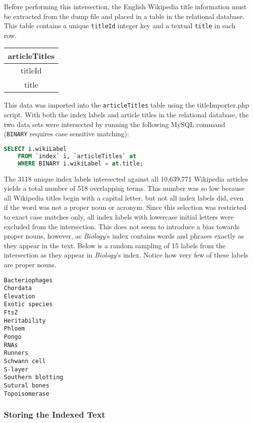 Before performing this intersection, the English Wikipedia title information must be extracted from the dump file and placed in a table in the relational database.
This table contains a unique {\tt titleId} integer key and a textual {\tt title} in each row.

\begin{center}
\begin{tabular}{|c|}
\hline 
{\bf articleTitles} \\ 
\hline 
titleId \\ 
\hline 
title \\ 
\hline 
\end{tabular} 
\end{center}

This data was imported into the {\tt articleTitles} table using the titleImporter.php script.
With both the index labels and article titles in the relational database, the two data sets were intersected by running the following MySQL command ({\tt BINARY} requires case sensitive matching):

\begin{lstlisting}[language=SQL]
SELECT i.wikiLabel
    FROM `index` i, `articleTitles` at
    WHERE BINARY i.wikiLabel = at.title;
\end{lstlisting}

The 3118 unique index labels intersected against all 10,639,771 Wikipedia articles yields a total number of 518 overlapping terms.
This number was so low because all Wikipedia titles begin with a capital letter, but not all index labels did, even if the word was not a proper noun or acronym.
Since this selection was restricted to exact case matches only, all index labels with lowercase initial letters were excluded from the intersection.
This does not seem to introduce a bias towards proper nouns, however, as {\it Biology}'s index contains words and phrases exactly as they appear in the text.
Below is a random sampling of 15 labels from the intersection as they appear in {\it Biology}'s index.
Notice how very few of these labels are proper nouns.

\begin{multicols}{3}
\begin{verbatim}
Bacteriophages
Chordata
Elevation
Exotic species
FtsZ
Heritability
Phloem
Pongo
RNAs
Runners
Schwann cell
S-layer
Southern blotting
Sutural bones
Topoisomerase
\end{verbatim}
\end{multicols}

\subsubsection{Storing the Indexed Text}

